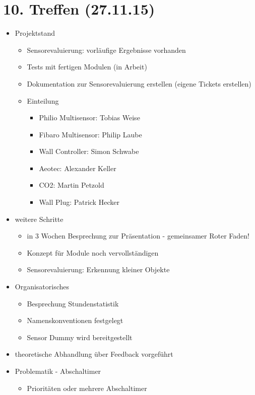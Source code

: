 \section{10. Treffen (27.11.15)}
\begin{itemize}
\item Projektstand
	\begin{itemize}
	\item Sensorevaluierung: vorläufige Ergebnisse vorhanden
    \item Tests mit fertigen Modulen (in Arbeit)
    \item Dokumentation zur Sensorevaluierung erstellen (eigene Tickets erstellen)
    \item Einteilung
    	\begin{itemize}
        \item Philio Multisensor: Tobias Weise
        \item Fibaro Multisensor: Philip Laube
        \item Wall Controller: Simon Schwabe
        \item Aeotec: Alexander Keller
        \item CO2: Martin Petzold
        \item Wall Plug: Patrick Hecker
        \end{itemize}
	\end{itemize}
\item weitere Schritte
	\begin{itemize}
    \item in 3 Wochen Besprechung zur Präsentation - gemeinsamer Roter Faden!
    \item Konzept für Module noch vervollständigen
    \item Sensorevaluierung: Erkennung kleiner Objekte
	\end{itemize}
\item Organisatorisches
	\begin{itemize}
   	\item  Besprechung Stundenstatistik
    \item Namenskonventionen festgelegt
    \item Sensor Dummy wird bereitgestellt
	\end{itemize}
\item theoretische Abhandlung über Feedback vorgeführt

\item Problematik - Abschaltimer
	\begin{itemize}
    \item Prioritäten oder mehrere Abschaltimer
    \end{itemize}
\end{itemize}


